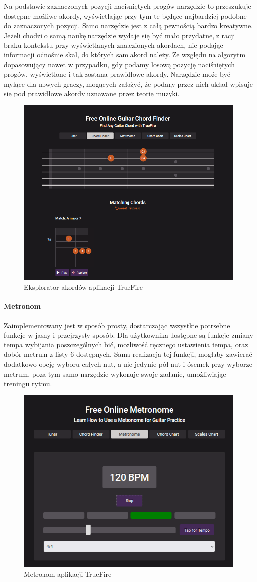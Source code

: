 Na podstawie zaznaczonych pozycji naciśniętych progów narzędzie to przeszukuje dostępne możliwe akordy, wyświetlając przy tym te będące najbardziej podobne do zaznaczonych pozycji. Samo narzędzie jest z całą pewnością bardzo kreatywne. Jeżeli chodzi o samą naukę narzędzie wydaje się być mało przydatne, z racji braku kontekstu przy wyświetlanych znalezionych akordach, nie podając informacji odnośnie skal, do których sam akord należy. Ze względu na algorytm dopasowujący nawet w przypadku, gdy podamy losową pozycję naciśniętych progów, wyświetlone i tak zostana prawidłowe akordy. Narzędzie może być mylące dla nowych graczy, mogących założyć, że podany przez nich układ wpisuje się pod prawidłowe akordy uznawane przez teorię muzyki.

\begin{figure}[htb]
	\centering
	\includegraphics[width=.5\linewidth]{rys02/ChordFinder}
	\caption{Eksplorator akordów aplikacji TrueFire} \label{fig:pageLayout}
\end{figure}

\paragraph{Metronom}
Zaimplementowany jest w sposób prosty, dostarczając wszystkie potrzebne funkcje w jasny i przejrzysty sposób. Dla użytkownika dostępne są funkcje zmiany tempa wybijania poszczególnych bić, możliwość ręcznego ustawienia tempa, oraz dobór metrum z listy 6 dostępnych. Sama realizacja tej funkcji, mogłaby zawierać dodatkowo opcję wyboru całych nut, a nie jedynie pół nut i ósemek przy wyborze metrum, poza tym samo narzędzie wykonuje swoje zadanie, umożliwiając treningu rytmu.

\begin{figure}[htb]
	\centering
	\includegraphics[width=.4\linewidth]{rys02/METRO}
	\caption{Metronom aplikacji TrueFire} \label{fig:pageLayout}
\end{figure}


